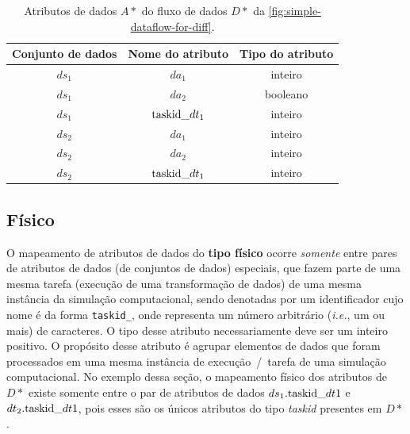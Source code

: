 \begin{table}[htb]
    \centering
    \begin{tabular}{c|c|c}
    \textbf{Conjunto de dados} & \textbf{Nome do atributo} & \textbf{Tipo do atributo} \\ \hline
$ds_1$                        & $da_1$                        & inteiro                 \\
$ds_1$                        & $da_2$                        & booleano                \\
$ds_1$                        & $\textup{taskid\_}dt_1$      & inteiro                 \\ \hline
$ds_2$                        & $da_1$                        & inteiro                 \\
$ds_2$                        & $da_2$                        & inteiro                 \\
$ds_2$                        & $\textup{taskid\_}dt_1$      & inteiro                
    \end{tabular}
    \caption[Atributos de dados do fluxo de dados da \autoref{fig:simple-dataflow-for-diff}]{Atributos de dados \(A\ast\) do fluxo de dados \(D\ast\) da \autoref{fig:simple-dataflow-for-diff}.}
    \label{tab:simple-attributes-for-diff}
\end{table}

\subsection{Físico}%
\label{subsec:rastro-de-proveniencia-do-tipo-fisico}

O mapeamento de atributos de dados do \textbf{tipo físico} ocorre \emph{somente} entre pares de atributos de dados (de conjuntos de dados) especiais, que fazem parte de uma mesma tarefa (execução de uma transformação de dados) de uma mesma instância da simulação computacional, sendo denotadas por um identificador cujo nome é da forma \texttt{taskid\_\ast}, onde \ast{} representa um número arbitrário (\textit{i.e.}, um ou mais) de caracteres. O tipo desse atributo necessariamente deve ser um inteiro positivo. O propósito desse atributo é agrupar elementos de dados que foram processados em uma mesma instância de execução~/~tarefa de uma simulação computacional. No exemplo dessa seção, o mapeamento físico dos atributos de \(D\ast\) existe somente entre o par de atributos de dados \(ds_1.\textup{taskid\_}dt1\) e \(dt_2.\textup{taskid\_}dt1\), pois esses são os únicos atributos do tipo \textit{taskid} presentes em \(D\ast\).

